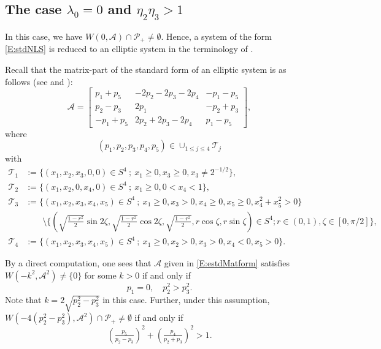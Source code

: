 \documentclass[11pt,a4paper,oneside]{amsart}
\theoremstyle{plain}
\theoremstyle{remark}
\numberwithin{equation}{section}
\def\le{\leqslant}
\def\ge{\geqslant}
\theoremstyle{definition}
\begin{document}
\subsection{The case $\lambda_0=0$ and $\eta_2\eta_3>1$}
In this case, we have
$W(0,\mathscr{A}) \cap \mathcal{P}_+ \neq \emptyset$.
Hence, a system of the form \eqref{E:stdNLS} is reduced to an elliptic system in the terminology of \cite{M}.

Recall that the matrix-part of the standard form of an elliptic system is as follows (see \cite[Theorem 1.10]{M} and \cite{M3}):
\begin{equation}\label{E:estdMatform}
	\mathscr{A}=\begin{bmatrix}
	p_1+p_5 & -2p_2-2p_3-2p_4 & - p_1- p_5 \\
	p_{2}-p_3 & 2p_1& - p_{2}+p_3 \\
	-p_1+p_5 & 2p_{2}+2p_3-2p_4 & p_1 - p_5
	\end{bmatrix},
\end{equation}
where
\[
	(p_1,p_2,p_3,p_4,p_5) \in \cup_{1 \le j \le 4} \mathcal{T}_j
\]
with
\begin{align*}
	\mathcal{T}_1 &:= \{ (x_1,x_2,x_3,0,0) \in S^4\ ;\ x_1\ge0, x_3\ge0, x_3 \neq 2^{-1/2} \},\\
	\mathcal{T}_2 &:= \{ (x_1,x_2,0,x_4,0) \in S^4\ ;\ x_1\ge0, 0< x_4<1 \},\\
	\mathcal{T}_3 &:= \{ (x_1,x_2,x_3,x_4,x_5) \in S^4\ ;\ x_1\ge0, x_3>0, x_4\ge0, x_5\ge0, x_4^2+x_5^2>0\}\\
	&\qquad \setminus  \{ ( \sqrt{\tfrac{1-r^2}2}\sin 2\zeta, \sqrt{\tfrac{1-r^2}2}\cos 2\zeta, \sqrt{\tfrac{1-r^2}2} ,r \cos \zeta, r\sin \zeta) \in S^4; r \in (0,1) ,\zeta \in [0,\pi/2]\}, \\
	\mathcal{T}_4 &:= \{ (x_1,x_2,x_3,x_4,x_5) \in S^4\ ;\ x_1\ge0, x_2>0,x_3>0,x_4<0,x_5>0 \}.
\end{align*}

By a direct computation, one sees that $\mathscr{A}$ given in \eqref{E:estdMatform} satisfies $W(-k^2, \mathscr{A}^2) \neq \{0\}$ for some $k>0$ if and only if
\begin{equation}\label{E:Econd1}
	p_1 = 0 ,\quad p_2^2 >p_3^2.
\end{equation}
Note that $k= 2\sqrt{p_2^2-p_3^2}$ in this case.
Further, under this assumption, $W(-4(p_2^2-p^2_3), \mathscr{A}^2) \cap \mathcal{P}_+ \neq \emptyset $ if and only if
\begin{equation}\label{E:Econd2}
	(\tfrac{p_5}{p_2-p_3})^2 + 	(\tfrac{p_4}{p_2+p_3})^2 >1.
\end{equation}
\end{document}
